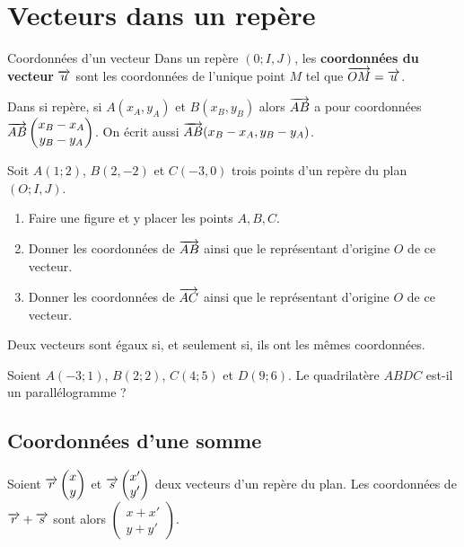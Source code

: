 \documentclass[11pt]{article}
\begin{document}
\section{Vecteurs dans un repère}
\begin{defi}{Coordonnées d'un vecteur}
  Dans un repère $(0; I, J)$, les \textbf{coordonnées du vecteur} $\overrightarrow{u}$ sont
  les coordonnées de l'unique point $M$ tel que $\overrightarrow{OM}=\overrightarrow{u}$.
\end{defi}
\begin{prop}
  Dans si repère, si $A(x_A, y_A)$ et $B(x_B, y_B)$ alors $\overrightarrow{AB}$ a pour
  coordonnées $\overrightarrow{AB}\begin{pmatrix}x_B-x_A\\y_B-y_A\end{pmatrix}$. On écrit
  aussi $\overrightarrow{AB}(x_B-x_A,y_B-y_A)$.
\end{prop}
\begin{app}
  Soit $A(1;2)$, $B(2, -2)$ et $C(-3, 0)$ trois points d'un repère du plan $(O;
  I, J)$.
  \begin{enumerate}
    \item Faire une figure et y placer les points $A, B, C$.
    \item Donner les coordonnées de $\overrightarrow{AB}$ ainsi que le représentant
      d'origine $O$ de ce vecteur.
    \item Donner les coordonnées de $\overrightarrow{AC}$ ainsi que le représentant
      d'origine $O$ de ce vecteur.
  \end{enumerate}
\end{app}

\begin{prop}
  Deux vecteurs sont égaux si, et seulement si, ils ont les mêmes coordonnées.
\end{prop}

\begin{app}
  Soient $A(-3; 1)$, $B(2; 2)$, $C(4; 5)$ et $D(9; 6)$. Le quadrilatère $ABDC$
  est-il un parallélogramme ?
\end{app}

\subsection{Coordonnées d'une somme}
\begin{prop}
  Soient $\overrightarrow{r}\begin{pmatrix}x\\y\end{pmatrix}$ et
  $\overrightarrow{s}\begin{pmatrix}x'\\y'\end{pmatrix}$ deux vecteurs d'un repère du plan.
  Les coordonnées de $\overrightarrow{r}+\overrightarrow{s}$ sont alors
  $\begin{pmatrix}x+x'\\y+y'\end{pmatrix}$.
\end{prop}
\end{document}
